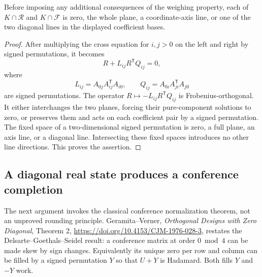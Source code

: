 \begin{lemma}
Before imposing any additional consequences of the weighing
property, each of $K\cap\mathcal R$ and $K\cap\mathcal F$ is zero,
the whole plane, a coordinate-axis line, or one of the two diagonal
lines in the displayed coefficient bases.
\end{lemma}
\begin{proof}
After multiplying the cross equation for $i,j>0$ on the left and
right by signed permutations, it becomes
\[
 R+L_{ij}R^{\mathsf T}Q_{ij}=0,
\]
where
\[
 L_{ij}=A_{0j}A_{ij}^{\mathsf T}A_{i0},\qquad
 Q_{ij}=A_{0i}A_{ji}^{\mathsf T}A_{j0}
\]
are signed permutations. The operator
$R\mapsto-L_{ij}R^{\mathsf T}Q_{ij}$ is Frobenius-orthogonal.
It either interchanges the two planes, forcing their pure-component
solutions to zero, or preserves them and acts on each coefficient
pair by a signed permutation. The fixed space of a two-dimensional
signed permutation is zero, a full plane, an axis line, or a
diagonal line. Intersecting these fixed spaces introduces no other
line directions. This proves the assertion.
\end{proof}

\subsection{A diagonal real state produces a conference completion}
The next argument invokes the classical conference normalization
theorem, not an unproved rounding principle. Geramita--Verner,
\emph{Orthogonal Designs with Zero Diagonal}, Theorem 2,
\url{https://doi.org/10.4153/CJM-1976-028-3}, restates the
Delsarte--Goethals--Seidel result: a conference matrix at order
$0\bmod4$ can be made skew by sign changes. Equivalently its
unique zero per row and column can be filled by a signed permutation
$Y$ so that $U+Y$ is Hadamard. Both fills $Y$ and $-Y$ work.

